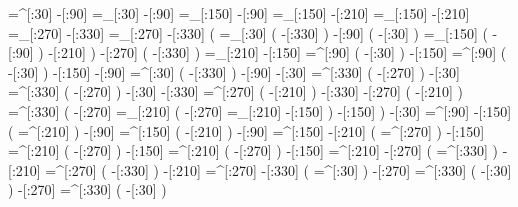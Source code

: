      =^[:30]%
      -[:90]%
     =_[:30]%
      -[:90]%
    =_[:150]%
      -[:90]%
    =_[:150]%
     -[:210]%
    =_[:150]%
     -[:210]%
    =_[:270]%
     -[:330]%
    =_[:270]%
     -[:330]%
               (
         =_[:30]%
                   (
             -[:330]%
                   )
          -[:90]%
                   (
              -[:30]%
                   )
        =_[:150]%
                   (
              -[:90]%
                   )
         -[:210]%
               )
     -[:270]%
               (
         -[:330]%
               )
    =_[:210]%
     -[:150]%
     =^[:90]%
               (
          -[:30]%
               )
     -[:150]%
     =^[:90]%
               (
          -[:30]%
               )
     -[:150]%
      -[:90]%
     =^[:30]%
               (
         -[:330]%
               )
      -[:90]%
      -[:30]%
    =^[:330]%
               (
         -[:270]%
               )
      -[:30]%
    =^[:330]%
               (
         -[:270]%
               )
      -[:30]%
     -[:330]%
    =^[:270]%
               (
         -[:210]%
               )
     -[:330]%
     -[:270]%
               (
         -[:210]%
               )
    =^[:330]%
               (
         -[:270]%
        =_[:210]%
                   (
             -[:270]%
            =_[:210]%
             -[:150]%
                   )
         -[:150]%
               )
      -[:30]%
     =^[:90]%
     -[:150]%
               (
        =^[:210]%
               )
      -[:90]%
    =^[:150]%
               (
         -[:210]%
               )
      -[:90]%
    =^[:150]%
     -[:210]%
               (
        =^[:270]%
               )
     -[:150]%
    =^[:210]%
               (
         -[:270]%
               )
     -[:150]%
    =^[:210]%
               (
         -[:270]%
               )
     -[:150]%
    =^[:210]%
     -[:270]%
               (
        =^[:330]%
               )
     -[:210]%
    =^[:270]%
               (
         -[:330]%
               )
     -[:210]%
    =^[:270]%
     -[:330]%
               (
         =^[:30]%
               )
     -[:270]%
    =^[:330]%
               (
          -[:30]%
               )
     -[:270]%
    =^[:330]%
               (
          -[:30]%
               )